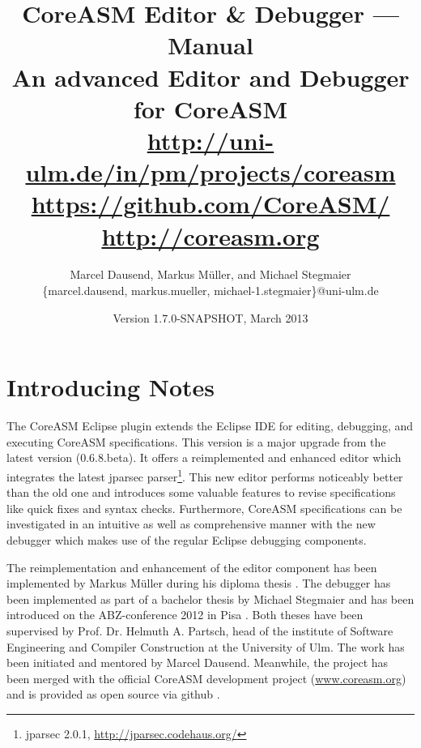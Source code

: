 \documentclass[10pt,oneside,a4paper]{article}
\begin{document}
\title{
	CoreASM Editor \& Debugger --- Manual
	\vspace{.5cm}\\
	\huge An advanced Editor and Debugger\\for CoreASM\\%
	\vspace{.5cm}
	\normalsize
	\url{http://uni-ulm.de/in/pm/projects/coreasm}\\
	\url{https://github.com/CoreASM/}\\
	\url{http://coreasm.org}
}

\author{Marcel Dausend, Markus Müller, and Michael Stegmaier\\ \ttfamily \small \{marcel.dausend, markus.mueller, michael-1.stegmaier\}@uni-ulm.de}
\date{Version 1.7.0-SNAPSHOT, March 2013}%

\maketitle
\vfill
\section{Introducing Notes}
The CoreASM Eclipse plugin extends the Eclipse IDE for editing, debugging, and executing CoreASM specifications. This version is a major upgrade from the latest version (0.6.8.beta). It offers a reimplemented and enhanced editor which integrates the latest jparsec parser\footnote{jparsec 2.0.1, \url{http://jparsec.codehaus.org/}}. This new editor performs noticeably better than the old one and introduces some valuable features to revise specifications like quick fixes and syntax checks. Furthermore, CoreASM specifications can be investigated in an intuitive as well as comprehensive manner with the new debugger which makes use of the regular Eclipse debugging components.

The reimplementation and enhancement of the editor component has been implemented by Markus Müller during his diploma thesis \cite{Mueller2012}. The debugger has been implemented as part of a bachelor thesis by Michael Stegmaier \cite{Stegmaier2012} and has been introduced on the ABZ-conference 2012 in Pisa \cite{Dausend.Stegmaier.ea2012}. Both theses have been supervised by Prof. Dr. Helmuth A. Partsch, head of the institute of Software Engineering and Compiler Construction at the University of Ulm. The work has been initiated and mentored by Marcel Dausend. Meanwhile, the project has been merged with the official CoreASM development project (\url{www.coreasm.org}) and is provided as open source via github \cite{Dausend.Farahbod.ea2012}.
\end{document}
